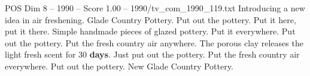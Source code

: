 \begin{textsample}{POS Dim 8 – 1990 – Score 1.00 – 1990/tv\_com\_1990\_119.txt}  \label{ex:f8_pos_071}
Introducing a new idea in air freshening.
Glade Country Pottery.
Put out the pottery.
Put it here, put it there.
Simple handmade pieces of glazed pottery.
Put it everywhere.
Put out the pottery.
Put the fresh country air anywhere.
The porous clay releases the light fresh scent for 30 \textbf{days}.
Just put out the pottery.
Put the fresh country air everywhere.
Put out the pottery.
New Glade Country Pottery.

\end{textsample}
